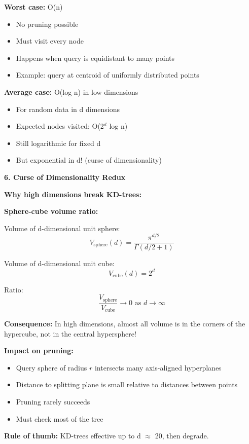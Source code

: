 \documentclass[12pt]{article}
\begin{document}
\begin{explanation}
\textbf{Worst case:} O(n)
\begin{itemize}
    \item No pruning possible
    \item Must visit every node
    \item Happens when query is equidistant to many points
    \item Example: query at centroid of uniformly distributed points
\end{itemize}

\textbf{Average case:} O(log n) in low dimensions
\begin{itemize}
    \item For random data in d dimensions
    \item Expected nodes visited: O(2$^d$ log n)
    \item Still logarithmic for fixed d
    \item But exponential in d! (curse of dimensionality)
\end{itemize}

\textbf{6. Curse of Dimensionality Redux}

\textbf{Why high dimensions break KD-trees:}

\textbf{Sphere-cube volume ratio:}

Volume of d-dimensional unit sphere:
\[
V_{\text{sphere}}(d) = \frac{\pi^{d/2}}{\Gamma(d/2 + 1)}
\]

Volume of d-dimensional unit cube:
\[
V_{\text{cube}}(d) = 2^d
\]

Ratio:
\[
\frac{V_{\text{sphere}}}{V_{\text{cube}}} \to 0 \text{ as } d \to \infty
\]

\textbf{Consequence:} In high dimensions, almost all volume is in the corners of the hypercube, not in the central hypersphere!

\textbf{Impact on pruning:}

\begin{itemize}
    \item Query sphere of radius $r$ intersects many axis-aligned hyperplanes
    \item Distance to splitting plane is small relative to distances between points
    \item Pruning rarely succeeds
    \item Must check most of the tree
\end{itemize}

\textbf{Rule of thumb:} KD-trees effective up to d $\approx$ 20, then degrade.


\end{explanation}
\end{document}

